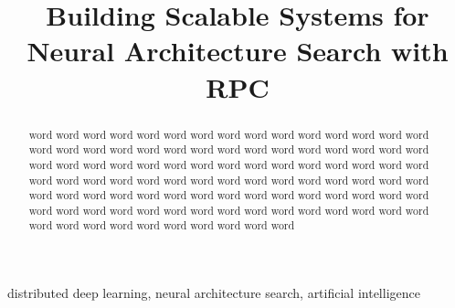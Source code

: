 \documentclass[conference]{IEEEtran}
\begin{document}
\title{Building Scalable Systems for Neural Architecture Search with RPC}

\author{
\and
{}
}

\maketitle

\begin{abstract}
  word word word word word word word word word word
  word word word word word word word word word word
  word word word word word word word word word word
  word word word word word word word word word word
  word word word word word word word word word word
  word word word word word word word word word word
  word word word word word word word word word word
  word word word word word word word word word word
  word word word word word word word word word word
  word word word word word word word word word word
\end{abstract}

\begin{IEEEkeywords}
distributed deep learning, neural architecture search, artificial intelligence
\end{IEEEkeywords}
\end{document}
